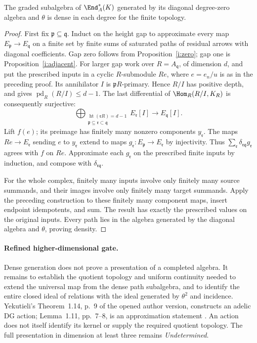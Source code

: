 \begin{proposition}\label{i:dense}
The graded subalgebra of $\End_A^*(K)$ generated by its diagonal
degree-zero algebra and $\theta$ is dense in each degree for the
finite topology.
\end{proposition}
\begin{proof}
First fix $\mathfrak p\subseteq\mathfrak q$. Induct on the height
gap to approximate every map $E_{\mathfrak p}\to E_{\mathfrak q}$
on a finite set by finite sums of saturated paths of residual
arrows with diagonal coefficients. Gap zero follows from
Proposition~\ref{i:zero}; gap one is Proposition~\ref{i:adjacent}.
For larger gap work over $R=A_{\mathfrak q}$, of dimension $d$,
and put the prescribed inputs in a cyclic $R$-submodule $Re$,
where $e=e_n/u$ is as in the preceding proof. Its annihilator $I$
is $\mathfrak pR$-primary. Hence $R/I$ has positive depth, and
\cite[Proposition 10.110.1]{StacksRegularResolution} gives
$\operatorname{pd}_R(R/I)\leq d-1$.
The last differential of $\Hom_R(R/I,K_R)$ is consequently
surjective:
\[
 \bigoplus_{\substack{\operatorname{ht}(\mathfrak rR)=d-1\\
                      \mathfrak p\subseteq\mathfrak r\subset\mathfrak q}}
 E_{\mathfrak r}[I]\longrightarrow E_{\mathfrak q}[I].
\]
Lift $f(e)$; its preimage has finitely many nonzero components
$y_{\mathfrak r}$. The maps $Re\to E_{\mathfrak r}$ sending
$e$ to $y_{\mathfrak r}$ extend to maps
$g_{\mathfrak r}:E_{\mathfrak p}\to E_{\mathfrak r}$ by
injectivity. Thus $\sum_{\mathfrak r}
\delta_{\mathfrak r\mathfrak q}g_{\mathfrak r}$ agrees with
$f$ on $Re$. Approximate each $g_{\mathfrak r}$ on the prescribed
finite inputs by induction, and compose with
$\delta_{\mathfrak r\mathfrak q}$.

For the whole complex, finitely many inputs involve only finitely
many source summands, and their images involve only finitely many
target summands. Apply the preceding construction to these finitely
many component maps, insert endpoint idempotents, and sum. The
result has exactly the prescribed values on the original inputs.
Every path lies in the algebra generated by the diagonal algebra
and $\theta$, proving density.
\end{proof}

\paragraph{Refined higher-dimensional gate.}
Dense generation does not prove a presentation of a completed
algebra. It remains to establish the quotient topology and uniform
continuity needed to extend the universal map from the dense path
subalgebra, and to identify the entire closed ideal of relations
with the ideal generated by $\theta^2$ and incidence.
Yekutieli's Theorem~1.14, p.~9 of the opened author version,
constructs an adelic DG action; Lemma~1.11, pp.~7--8, is an
approximation statement \cite{Yekutieli2003}. An action does not
itself identify its kernel or supply the required quotient topology.
The full presentation in dimension at least three remains
\emph{Undetermined}.
